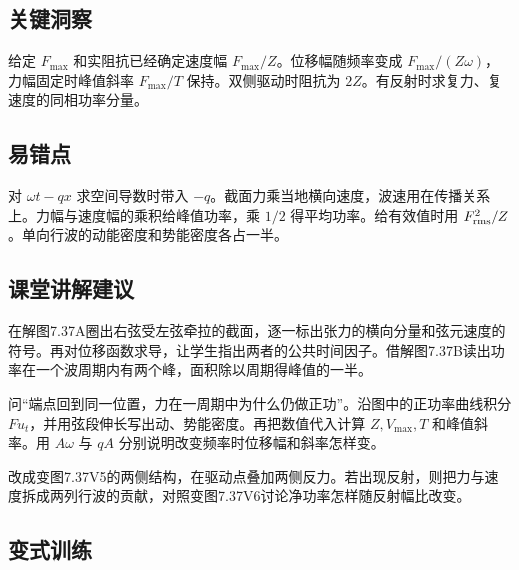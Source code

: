 \documentclass[UTF8,fontset=fandol,a4paper,11pt]{ctexart}
\begin{document}
\subsection*{关键洞察}

给定 $F_{\max}$ 和实阻抗已经确定速度幅 $F_{\max}/Z$。位移幅随频率变成 $F_{\max}/(Z\omega)$，力幅固定时峰值斜率 $F_{\max}/T$ 保持。双侧驱动时阻抗为 $2Z$。有反射时求复力、复速度的同相功率分量。




\subsection*{易错点}

对 $\omega t-qx$ 求空间导数时带入 $-q$。截面力乘当地横向速度，波速用在传播关系上。力幅与速度幅的乘积给峰值功率，乘 $1/2$ 得平均功率。给有效值时用 $F_{\rm rms}^2/Z$。单向行波的动能密度和势能密度各占一半。




\subsection*{课堂讲解建议}

在解图7.37A圈出右弦受左弦牵拉的截面，逐一标出张力的横向分量和弦元速度的符号。再对位移函数求导，让学生指出两者的公共时间因子。借解图7.37B读出功率在一个波周期内有两个峰，面积除以周期得峰值的一半。

问“端点回到同一位置，力在一周期中为什么仍做正功”。沿图中的正功率曲线积分 $Fu_t$，并用弦段伸长写出动、势能密度。再把数值代入计算 $Z,V_{\max},T$ 和峰值斜率。用 $A\omega$ 与 $qA$ 分别说明改变频率时位移幅和斜率怎样变。

改成变图7.37V5的两侧结构，在驱动点叠加两侧反力。若出现反射，则把力与速度拆成两列行波的贡献，对照变图7.37V6讨论净功率怎样随反射幅比改变。




\subsection*{变式训练}
\end{document}
